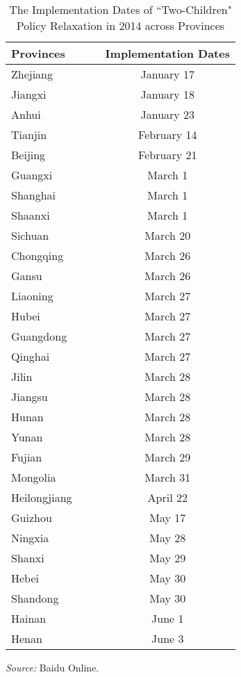 \documentclass[12pt]{extarticle}
\begin{document}
\begin{table}
\centering
\caption{The Implementation Dates of ``Two-Children" \\ Policy Relaxation in 2014 across Provinces} \label{tab:implementdates}
\begin{threeparttable}
\begin{tabular}{l*{3}{c}}
\hline
\textbf{Provinces} & & & \textbf{Implementation Dates} \\
\hline
Zhejiang & & & January 17 \\
Jiangxi & & & January 18 \\
Anhui & & & January 23 \\
Tianjin & & & February 14 \\
Beijing & & & February 21 \\
Guangxi & & & March 1 \\
Shanghai & & & March 1 \\
Shaanxi & & & March 1 \\
Sichuan & & & March 20 \\
Chongqing & & & March 26 \\
Gansu & & & March 26 \\
Liaoning & & & March 27 \\
Hubei & & & March 27 \\
Guangdong & & & March 27 \\
Qinghai & & & March 27 \\
Jilin & & & March 28 \\
Jiangsu & & & March 28 \\
Hunan & & & March 28 \\
Yunan & & & March 28 \\
Fujian & & & March 29 \\
Mongolia & & & March 31 \\
Heilongjiang & & & April 22 \\
Guizhou & & & May 17 \\
Ningxia & & & May 28 \\
Shanxi & & & May 29 \\
Hebei & & & May 30 \\
Shandong & & & May 30 \\
Hainan & & & June 1 \\
Henan & & & June 3 \\
\hline
\end{tabular}
\begin{tablenotes}
\footnotesize \textit{Source:} Baidu Online. \\
\end{tablenotes}
\end{threeparttable}                  
\end{table}
\end{document}
